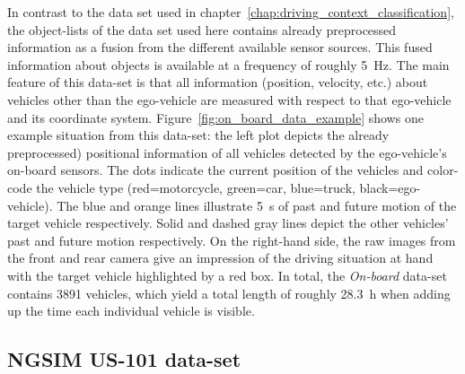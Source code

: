 In contrast to the data set used in chapter~\ref{chap:driving_context_classification}, the object-lists of the data set used here contains already preprocessed information as a fusion from the different available sensor sources.
This fused information about objects is available at a frequency of roughly \SI{5}{\hertz}.
The main feature of this data-set is that all information (position, velocity, etc.) about vehicles other than the ego-vehicle are measured with respect to that ego-vehicle and its coordinate system.
Figure~\ref{fig:on_board_data_example} shows one example situation from this data-set: the left plot depicts the already preprocessed) positional information of all vehicles detected by the ego-vehicle's on-board sensors.
The dots indicate the current position of the vehicles and color-code the vehicle type (red=motorcycle, green=car, blue=truck, black=ego-vehicle).
The blue and orange lines illustrate \SI{5}{\second} of past and future motion of the target vehicle respectively.
Solid and dashed gray lines depict the other vehicles' past and future motion respectively.
On the right-hand side, the raw images from the front and rear camera give an impression of the driving situation at hand with the target vehicle highlighted by a red box.
In total, the \emph{On-board} data-set contains \num{3891} vehicles, which yield a total length of roughly \SI{28.3}{\hour} when adding up the time each individual vehicle is visible.

\subsection{\acs{NGSIM} US-101 data-set}
\label{subsec:ngsim-dataset}

